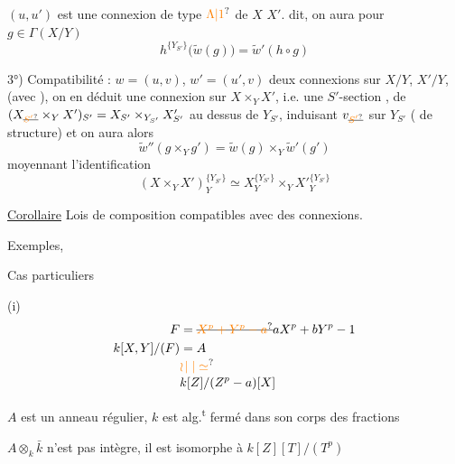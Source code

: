 $(u,u')$ est une connexion de type $\unsure{\Lambda|1}$ de $X$  $X'$.  dit, on aura pour $g\in\Gamma(X/Y)$
\[
 h^{\{Y_{S'}\}}\bigl(\widetilde w(g)\bigr)=\widetilde w'(h\circ g)
\]

3°) Compatibilité  :  $w=(u,v)$, $w'=(u',v)$ deux connexions sur $X/Y$, $X'/Y$, (avec ), on en déduit une connexion sur $X\times_Y X'$,  i.e. une $S'$-section ,  de $(X_{\deleted{\unsure{S'}}}\times_Y X')_{S'}=X_{S'}\times_{Y_{S'}}X'_{S'}$ au dessus de $Y_{S'}$, induisant $v_{\deleted{\unsure{S'}}}$ sur $Y_{S'}$ ( de structure)  et on aura alors
\[
 \widetilde w''(g\times_Yg')=\widetilde w(g)\times_Y\widetilde w'(g')
\]
moyennant l'identification
\[
 (X\times_YX')^{\{Y_{S'}\}}_Y\simeq X^{\{Y_{S'}\}}_Y\times_Y X'^{\{Y_{S'}\}}_Y
\]

\uline{Corollaire} Lois de composition compatibles avec des connexions.


Exemples,

Cas particuliers


(i)
\[
\begin{aligned}
 F&=\deleted{\unsure{X^p+Y^p-a}}aX^p+bY^p-1\\
 k[X,Y]/(F)&=A\\[-2pt]
 &\unsure{\wr\!\mid|\simeq}\\[-2pt]
 &k[Z]/(Z^p-a)[X]
\end{aligned}
\]

 $A$ est un anneau régulier,  $k$ est alg.\textsuperscript{t} fermé dans son corps des fractions

$A\otimes_k\bar k$ n'est pas intègre, il est isomorphe à $k[Z][T]/(T^p)$

